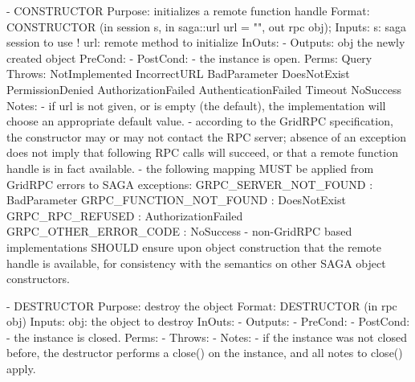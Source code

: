  
 \begin{myspec}
    - CONSTRUCTOR
      Purpose:  initializes a remote function handle
      Format:   CONSTRUCTOR  (in  session   s, 
                              in  saga::url url = "", 
                              out rpc       obj);
      Inputs:   s:            saga session to use
!               url:          remote method to
                              initialize
      InOuts:   -
      Outputs:  obj           the newly created object
      PreCond:  -
      PostCond: - the instance is open.
      Perms:    Query
      Throws:   NotImplemented
                IncorrectURL
                BadParameter
                DoesNotExist
                PermissionDenied
                AuthorizationFailed
                AuthenticationFailed
                Timeout
                NoSuccess
      Notes:    - if url is not given, or is empty (the 
                  default), the implementation will choose an 
                  appropriate default value.
                - according to the GridRPC specification, the 
                  constructor may or may not contact the RPC
                  server; absence of an exception does not imply
                  that following RPC calls will succeed, or that
                  a remote function handle is in fact available.
                - the following mapping MUST be applied from
                  GridRPC errors to SAGA exceptions:
                  GRPC_SERVER_NOT_FOUND   : BadParameter
                  GRPC_FUNCTION_NOT_FOUND : DoesNotExist
                  GRPC_RPC_REFUSED        : AuthorizationFailed
                  GRPC_OTHER_ERROR_CODE   : NoSuccess
                - non-GridRPC based implementations SHOULD ensure
                  upon object construction that the remote handle
                  is available, for consistency with the
                  semantics on other SAGA object constructors.
 
    - DESTRUCTOR
      Purpose:  destroy the object
      Format:   DESTRUCTOR           (in  rpc  obj)
      Inputs:   obj:                  the object to destroy
      InOuts:   -
      Outputs:  -
      PreCond:  - 
      PostCond: - the instance is closed.
      Perms:    -
      Throws:   - 
      Notes:    - if the instance was not closed before, the 
                  destructor performs a close() on the instance,
                  and all notes to close() apply.
 

\end{myspec}
